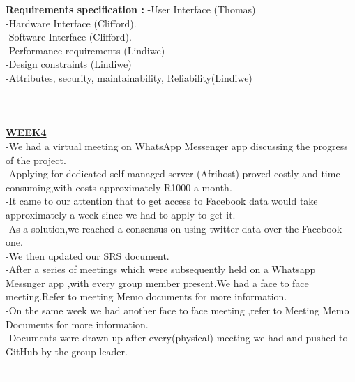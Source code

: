 \documentclass[12pt]{article}
\begin{document}
\textbf{Requirements specification :}
-User Interface (Thomas)\\
-Hardware Interface (Clifford).\\
-Software Interface (Clifford).\\
-Performance requirements (Lindiwe)\\
-Design constraints (Lindiwe)\\
-Attributes, security, maintainability, Reliability(Lindiwe)\\
\\
\\
\\
					\underline{	\textbf{WEEK4}}\\
						
-We had a virtual meeting on WhatsApp Messenger app discussing the progress of the project.\\
-Applying for dedicated self managed server (Afrihost) proved costly and time consuming,with costs approximately R1000 a month.\\
-It came to our attention that to get access to Facebook data would take approximately a week since we had to apply to get it.\\
-As a solution,we reached a consensus on using twitter data over the Facebook one.\\
-We then updated our SRS document.\\
-After a series of meetings which were subsequently held on a Whatsapp Messnger app ,with every group member present.We had a face to face meeting.Refer to meeting Memo documents for more information.\\
-On the same week we had another face to face meeting ,refer to Meeting Memo Documents for more information. \\
-Documents were drawn up after every(physical) meeting we had and pushed to GitHub by the group leader. 



-
												
     

		         


		


 
\end{document}
